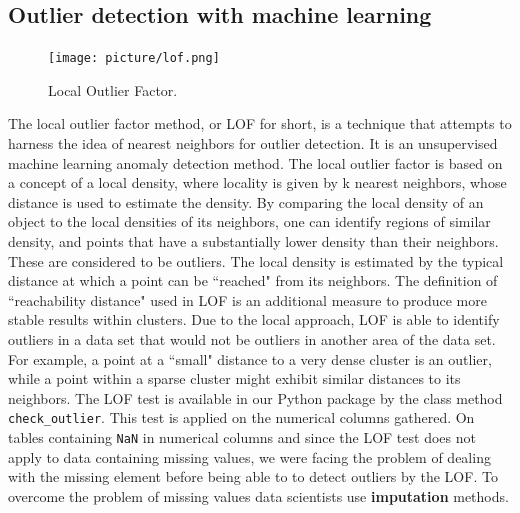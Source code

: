 \documentclass{article}
\begin{document}
\subsection{Outlier detection with machine learning} %
\label{sub:Outlier detection with machine learning}
\begin{figure}[H]
    \centering
    \texttt{[image: picture/lof.png]}
    \caption{Local Outlier Factor.}
    \label{fig:lof}
\end{figure}
The local outlier factor method, or LOF for short, is a technique that attempts to harness the idea of nearest neighbors for outlier detection.
It is an unsupervised machine learning anomaly detection method.
The local outlier factor is based on a concept of a local density, where locality is given by k nearest neighbors, whose distance is used to estimate the density.
By comparing the local density of an object to the local densities of its neighbors, one can identify regions of similar density, and points that have a substantially lower density than their neighbors. These are considered to be outliers.
The local density is estimated by the typical distance at which a point can be ``reached" from its neighbors.
The definition of ``reachability distance" used in LOF is an additional measure to produce more stable results within clusters.
Due to the local approach, LOF is able to identify outliers in a data set that would not be outliers in another area of the data set.
For example, a point at a ``small" distance to a very dense cluster is an outlier, while a point within a sparse cluster might exhibit similar distances to its neighbors.
The LOF test is available in our Python package by the class method \texttt{check\_outlier}.
This test is applied on the numerical columns gathered.
On tables containing \texttt{NaN} in numerical columns and since the LOF test does not apply to data containing missing values, we were facing the problem of dealing with the missing element before being able to to detect outliers by the LOF.
To overcome the problem of missing values data scientists use \textbf{imputation} methods.\\
\end{document}
